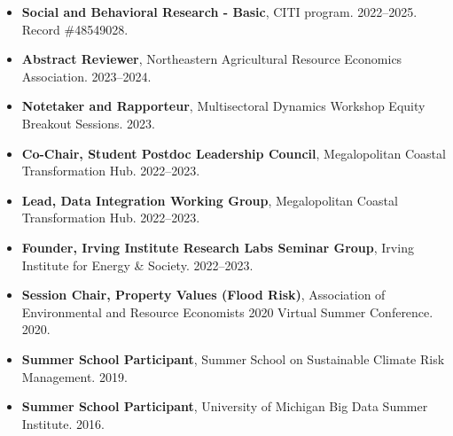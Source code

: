 \documentclass[10pt,oneside]{article}
\begin{document}
\begin{itemize}[label={}]
  
  \item \textbf{Social and Behavioral Research - Basic}, CITI program. 2022--2025.\\Record \#48549028.
  
  \item \textbf{Abstract Reviewer}, Northeastern Agricultural Resource Economics Association. 2023--2024.
  
  \item \textbf{Notetaker and Rapporteur}, Multisectoral Dynamics Workshop Equity Breakout Sessions. 2023.
  
  \item \textbf{Co-Chair, Student Postdoc Leadership Council}, Megalopolitan Coastal Transformation Hub. 2022--2023.
  
  \item \textbf{Lead, Data Integration Working Group}, Megalopolitan Coastal Transformation Hub. 2022--2023.
  
  \item \textbf{Founder, Irving Institute Research Labs Seminar Group}, Irving Institute for Energy \& Society. 2022--2023.
  
  \item \textbf{Session Chair, Property Values (Flood Risk)}, Association of Environmental and Resource Economists 2020 Virtual Summer Conference. 2020.
  
  \item \textbf{Summer School Participant}, Summer School on Sustainable Climate Risk Management. 2019.
  
  \item \textbf{Summer School Participant}, University of Michigan Big Data Summer Institute. 2016.
  
\end{itemize}
\end{document}

